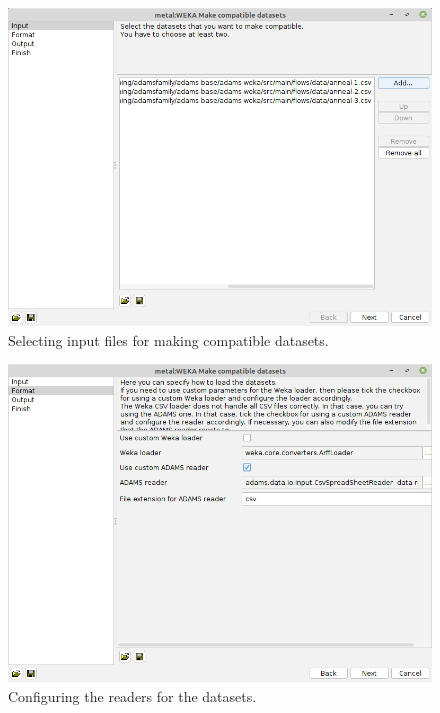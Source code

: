 \begin{figure}[htb]
  \centering
  \includegraphics[width=12.0cm]{images/makecompatible1.png}
  \caption{Selecting input files for making compatible datasets.}
  \label{makecompatible1}
\end{figure}

\begin{figure}[htb]
  \centering
  \includegraphics[width=12.0cm]{images/makecompatible2.png}
  \caption{Configuring the readers for the datasets.}
  \label{makecompatible2}
\end{figure}

